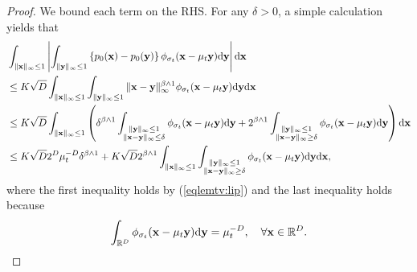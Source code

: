 \documentclass[twoside,11pt]{article}
\newcommand{\bx}{{\bf x}}
\newcommand{\by}{{\bf y}}
\newcommand{\bbR}{{\mathbb R}}
\newcommand{\be}{\begin{equation}}
\newcommand{\ee}{\end{equation}}
\def\d{{\rm d}}
\begin{document}
\begin{proof}
We bound each term on the RHS.
For any $\delta > 0$, a simple calculation yields that
\be
\begin{split}
& \int_{\| \bx \|_{\infty} \leq 1} \left\vert   \int_{\| \by \|_{\infty} \leq 1} \left\{ p_0(\bx) - p_0(\by) \right\} \phi_{\sigma _t}(\bx - \mu_t \by) \d \by \right\vert \d \bx 
\\
& \leq K\sqrt{D} \int_{\| \bx \|_{\infty} \leq 1}    \int_{\| \by \|_{\infty} \leq 1}  \|\bx-\by\|_{\infty}^{\beta \wedge 1} \phi_{\sigma _t}(\bx - \mu_t \by) \d \by  \d \bx 
\\
& \leq  K\sqrt{D}\int_{\| \bx \|_{\infty} \leq 1} \left(  \delta^{\beta \wedge 1} \int_{\substack{ \| \by \|_{\infty} \leq 1 \\ \|\bx-\by\|_{\infty}\leq \delta  }}  \phi_{\sigma_{t}}(\bx-\mu_t \by) \d \by + 2^{\beta \wedge 1}  \int_{\substack{ \| \by \|_{\infty} \leq 1 \\ \|\bx-\by\|_{\infty} \geq \delta  }}  \phi_{\sigma_{t}}(\bx-\mu_t \by) \d \by \right) \d \bx
\\
& \leq K\sqrt{D} 2^{D} \mu_{t}^{-D} \delta^{\beta \wedge 1}
+ K\sqrt{D} 2^{\beta \wedge 1} \int_{\| \bx \|_{\infty} \leq 1} \int_{\substack{ \| \by \|_{\infty} \leq 1 \\ \|\bx-\by\|_{\infty}\geq \delta  }}  \phi_{\sigma_{t}}(\bx-\mu_t \by) \d \by \d \bx,
\label{eqlemtv:int1}
\end{split}
\ee
where the first inequality holds by (\ref{eqlemtv:lip}) and the last inequality holds because
\be
\int_{\bbR^{D}} \phi_{\sigma_t}(\bx-\mu_t \by) \d \by
= \mu_{t}^{-D}, \quad \forall \bx \in \bbR^{D}.
\label{eqlemtv:norm}
\ee


\end{proof}
\end{document}
